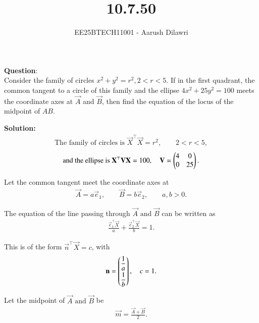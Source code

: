 \documentclass[journal]{IEEEtran}
\begin{document}

\vspace{3cm}

\title{10.7.50}
\author{EE25BTECH11001 - Aarush Dilawri}
{\let\newpage\relax\maketitle}

\renewcommand{\thefigure}{\theenumi}
\renewcommand{\thetable}{\theenumi}
\setlength{\intextsep}{10pt} %
\textbf{Question}:\\
Consider the family of circles $x^2 + y^2 = r^2 , 2 < r < 5$. If in the first quadrant, the
common tangent to a circle of this family and the ellipse $4x^2 + 25y^2 = 100$ meets
the coordinate axes at $\vec{A}$ and $\vec{B}$, then find the equation of the locus of the midpoint of $AB$.

\textbf{Solution:} \\
\begin{align}
\text{The family of circles is } 
\vec{X}^\top\vec{X} = r^2,\qquad 2<r<5,
\end{align}
\begin{align}
\text{and the ellipse is } 
\mathbf{X}^\top\mathbf{V}\mathbf{X} = 100,\quad
\mathbf{V} = \begin{pmatrix}4 & 0 \\ 0 & 25\end{pmatrix}.
\end{align}

Let the common tangent meet the coordinate axes at 
\begin{align}
\vec{A} = a\vec{e}_1,\qquad \vec{B} = b\vec{e}_2,
\qquad a,b>0.
\end{align}

The equation of the line passing through $\vec{A} \text{ and } \vec{B}$ can be written as 
\begin{align}
\frac{\vec{e}_1^\top\vec{X}}{a}+\frac{\vec{e}_2^\top\vec{X}}{b}=1.
\end{align}

This is of the form  $\vec{n}^\top\vec{X}=c$, with 
\begin{align}
\mathbf{n} = \begin{pmatrix}\dfrac{1}{a}\\[6pt]\dfrac{1}{b}\end{pmatrix},
\quad c=1.
\end{align}

Let the midpoint of $\vec{A} \text{ and } \vec{B}$ be 
\begin{align}
\vec{m} = \frac{\vec{A}+\vec{B}}{2}.
\end{align}
\end{document}
